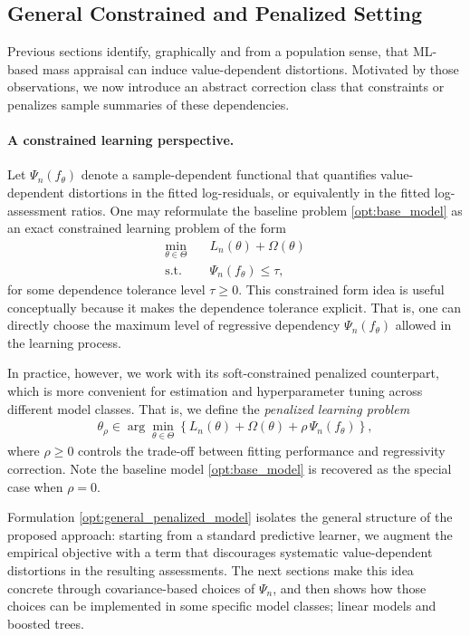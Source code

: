\documentclass[12pt, draft]{article}
\theoremstyle{plain}
\theoremstyle{definition}
\newcommand{\1}{\mathbf{1}}
\begin{document}
{\subsection{General Constrained and Penalized Setting}
\label{subsec:general_penalized_setting}

Previous sections identify, graphically and from a population sense, that ML-based mass appraisal can induce value-dependent distortions. Motivated by those observations, we now introduce an abstract correction class that constraints or penalizes sample summaries of these dependencies.

\paragraph{A constrained learning perspective.} Let $\Psi_n(f_\theta)$ denote a sample-dependent functional that quantifies value-dependent distortions in the fitted log-residuals, or equivalently in the fitted log-assessment ratios. One may reformulate the baseline problem \eqref{opt:base_model} as an exact constrained learning problem of the form
\begin{align}
\label{opt:general_constrained_model}
\min_{\theta\in\Theta}
\quad
& L_n(\theta)+\Omega(\theta)
\\
\text{s.t.}\quad
& \Psi_n(f_\theta)\le \tau,
\nonumber
\end{align}
for some dependence tolerance level $\tau\ge 0$. This constrained form idea is useful conceptually because it makes the dependence tolerance explicit. That is, one can directly choose the maximum level of regressive dependency $\Psi_n(f_\theta)$ allowed in the learning process. 


In practice, however, we work with its soft-constrained penalized counterpart, which is more convenient for estimation and hyperparameter tuning across different model classes. That is, we define the \textit{penalized learning problem}
\begin{align}
\label{opt:general_penalized_model}
\theta_\rho
\in
\arg\min_{\theta\in\Theta}
\left\{
L_n(\theta)+\Omega(\theta)+\rho\,\Psi_n(f_\theta)
\right\},
\end{align}
where $\rho\ge 0$ controls the trade-off between fitting performance and regressivity correction. Note the baseline model \eqref{opt:base_model} is recovered as the special case when $\rho=0$.

Formulation \eqref{opt:general_penalized_model} isolates the general structure of the proposed approach: starting from a standard predictive learner, we augment the empirical objective with a term that discourages systematic value-dependent distortions in the resulting assessments. The next sections make this idea concrete through covariance-based choices of $\Psi_n$, and then shows how those choices can be implemented in some specific model classes; linear models and boosted trees.


}
\end{document}
